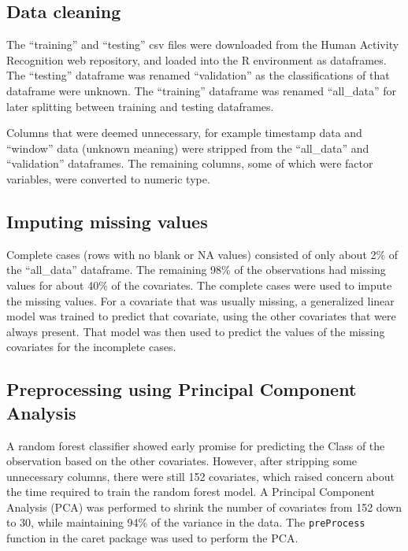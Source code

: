 \documentclass[]{article}
\begin{document}
\hypertarget{data-cleaning}{%
\subsection{Data cleaning}\label{data-cleaning}}

The ``training'' and ``testing'' csv files were downloaded from the
Human Activity Recognition web repository, and loaded into the R
environment as dataframes. The ``testing'' dataframe was renamed
``validation'' as the classifications of that dataframe were unknown.
The ``training'' dataframe was renamed ``all\_data'' for later splitting
between training and testing dataframes.

Columns that were deemed unnecessary, for example timestamp data and
``window'' data (unknown meaning) were stripped from the ``all\_data''
and ``validation'' dataframes. The remaining columns, some of which were
factor variables, were converted to numeric type.

\hypertarget{imputing-missing-values}{%
\subsection{Imputing missing values}\label{imputing-missing-values}}

Complete cases (rows with no blank or NA values) consisted of only about
2\% of the ``all\_data'' dataframe. The remaining 98\% of the
observations had missing values for about 40\% of the covariates. The
complete cases were used to impute the missing values. For a covariate
that was usually missing, a generalized linear model was trained to
predict that covariate, using the other covariates that were always
present. That model was then used to predict the values of the missing
covariates for the incomplete cases.

\hypertarget{preprocessing-using-principal-component-analysis}{%
\subsection{Preprocessing using Principal Component
Analysis}\label{preprocessing-using-principal-component-analysis}}

A random forest classifier showed early promise for predicting the Class
of the observation based on the other covariates. However, after
stripping some unnecessary columns, there were still 152 covariates,
which raised concern about the time required to train the random forest
model. A Principal Component Analysis (PCA) was performed to shrink the
number of covariates from 152 down to 30, while maintaining 94\% of the
variance in the data. The \texttt{preProcess} function in the caret
package was used to perform the PCA.
\end{document}
